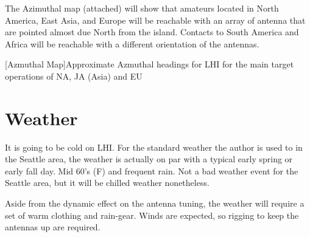 \documentclass[11pt]{article}
\begin{document}
The Azimuthal map (attached) will show that amateurs located in North America,
East Asia, and Europe will be reachable with an array of antenna that are pointed almost due North from the island.  Contacts to South America and Africa will
be reachable with a different orientation of the antennas.

\vskip2mm
\noindent%
\begin{minipage}{\linewidth}%
\captionsetup{width=0.8\linewidth}
[Azmuthal Map]{Approximate Azmuthal headings for LHI
for the main target operations of NA, JA (Asia) and EU}
\label{azim}
\end{minipage}
\vskip3mm

\section{Weather}

It is going to be cold on LHI.  For the standard weather
the author is used to in the Seattle area, the weather is actually
on par with a typical early spring or early fall day.  Mid 60's (F)
and frequent rain.  Not a bad weather event for the Seattle area,
but it will be chilled weather nonetheless. 
\par
Aside from the dynamic effect on the antenna tuning, the weather
will require a set of warm clothing and rain-gear.  Winds are 
expected, so rigging to keep the antennas up are required.
\end{document}
